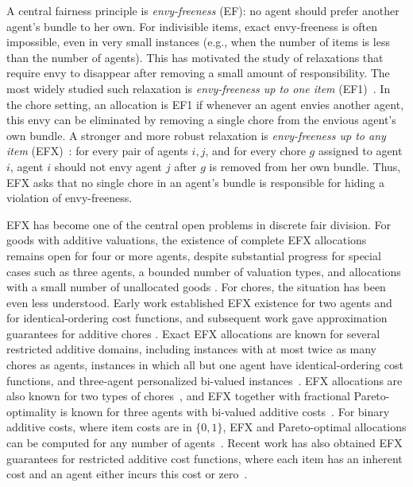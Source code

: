 \documentclass{article}
\theoremstyle{definition}
\begin{document}
A central fairness principle is \emph{envy-freeness} (EF): no agent should prefer
another agent's bundle to her own.
For indivisible items, exact envy-freeness is
often impossible, even in very small instances (e.g., when the number of items is less than the number of agents).  
This has motivated the study of relaxations that require envy to disappear after removing a small amount of
responsibility.  The most widely studied such relaxation is \emph{envy-freeness
up to one item} (EF1)~\citep{Lipton04onapproximately,budish2011combinatorial}.  In the chore setting, an allocation is EF1 if whenever an
agent envies another agent, this envy can be eliminated by removing a single chore
from the envious agent's own bundle.  A stronger and more robust relaxation is
\emph{envy-freeness up to any item} (EFX)~\citep{caragiannis2019unreasonable}: for every pair of agents $i,j$, and
for every chore $g$ assigned to agent $i$, agent $i$ should not envy agent $j$
after $g$ is removed from her own bundle.  
Thus, EFX asks that no single chore in an agent's bundle is responsible for hiding
a violation of envy-freeness.

EFX has become one of the central open problems in discrete fair division.  
For goods with additive valuations, the existence of complete EFX allocations remains
open for four or more agents, despite substantial progress for special cases such
as three agents, a bounded number of valuation types, and allocations with a small
number of unallocated goods
\citep{caragiannis2019envy,chaudhury2021little,mahara2023existence,hv2025efx,berger2022almost,akrami2025efx,li2022almost}.
For chores, the situation has been even less understood.  Early work established EFX existence for two agents and for identical-ordering cost functions, and subsequent work gave approximation guarantees for additive chores
\citep{garg2026existence,garg2025constant,zhou2024approximately}.  
Exact EFX allocations are known for several
restricted additive domains, including instances with at most twice as many chores as agents, instances in which all but one agent have identical-ordering
cost functions, and three-agent personalized bi-valued instances~\citep{kobayashi2025efx}.  
EFX allocations are also known for two types of chores~\citep{aziz2023fair}, and EFX together with fractional Pareto-optimality is known
for three agents with bi-valued additive costs~\citep{garg2023new}.  
For binary additive costs, where item costs are in $\{0,1\}$, EFX and Pareto-optimal
allocations can be computed for any number of agents~\citep{tao2025existence}.
Recent work has also obtained EFX guarantees for restricted additive cost
functions, where each item has an inherent cost and an agent either incurs this
cost or zero~\citep{lin2026allocating}.
\end{document}
